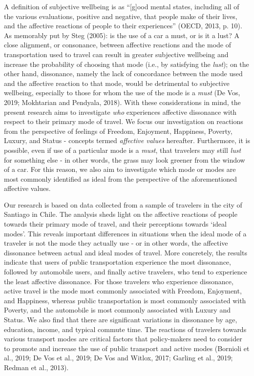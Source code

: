 \documentclass[]{elsarticle} %
\begin{document}
A definition of subjective wellbeing is as ``{[}g{]}ood mental states,
including all of the various evaluations, positive and negative, that
people make of their lives, and the affective reactions of people to
their experiences'' (OECD, 2013, p. 10). As memorably put by Steg
(2005): is the use of a car a must, or is it a lust? A close alignment,
or consonance, between affective reactions and the mode of
transportation used to travel can result in greater subjective wellbeing
and increase the probability of choosing that mode (i.e., by satisfying
the \emph{lust}); on the other hand, dissonance, namely the lack of
concordance between the mode used and the affective reaction to that
mode, would be detrimental to subjective wellbeing, especially to those
for whom the use of the mode is a \emph{must} (De Vos, 2019; Mokhtarian
and Pendyala, 2018). With these considerations in mind, the present
research aims to investigate \emph{who} experiences affective dissonance
with respect to their primary mode of travel. We focus our investigation
on reactions from the perspective of feelings of Freedom, Enjoyment,
Happiness, Poverty, Luxury, and Status - concepts termed \emph{affective
values} hereafter. Furthermore, it is possible, even if use of a
particular mode is a \emph{must}, that travelers may still \emph{lust}
for something else - in other words, the grass may look greener from the
window of a car. For this reason, we also aim to investigate which mode
or modes are most commonly identified as ideal from the perspective of
the aforementioned affective values.

Our research is based on data collected from a sample of travelers in
the city of Santiago in Chile. The analysis sheds light on the affective
reactions of people towards their primary mode of travel, and their
perceptions towards `ideal modes'. This reveals important differences in
situations when the ideal mode of a traveler is not the mode they
actually use - or in other words, the affective dissonance between
actual and ideal modes of travel. More concretely, the results indicate
that users of public transportation experience the most dissonance,
followed by automobile users, and finally active travelers, who tend to
experience the least affective dissonance. For those travelers who
experience dissonance, active travel is the mode most commonly
associated with Freedom, Enjoyment, and Happiness, whereas public
transportation is most commonly associated with Poverty, and the
automobile is most commonly associated with Luxury and Status. We also
find that there are significant variations in dissonance by age,
education, income, and typical commute time. The reactions of travelers
towards various transport modes are critical factors that policy-makers
need to consider to promote and increase the use of public transport and
active modes (Bornioli et al., 2019; De Vos et al., 2019; De Vos and
Witlox, 2017; Garling et al., 2019; Redman et al., 2013).
\end{document}

